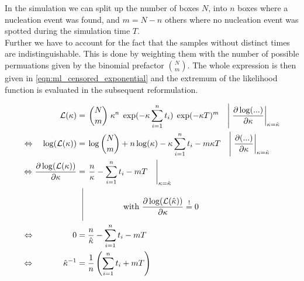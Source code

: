In the simulation we can split up the number of boxes $N$, into $n$ boxes where a nucleation event was found, and $m = N -n$ others where no nucleation event was spotted during the simulation time $T$.\\
Further we have to account for the fact that the samples without distinct times are indistinguishable. This is done by weighting them with the number of possible permuations given by the binomial prefactor $\binom{N}{m}$. The whole expression is then given in \autoref{eqn:ml_censored_exponential} and the extremum of the likelihood function is evaluated in the subsequent reformulation.

\begin{align}
\label{eqn:ml_censored_exponential} 
\mathcal{L}(\kappa) & = \left. \binom{N}{m} \;  \kappa^n \; \exp(- \kappa \sum_{i=1}^n t_i) \;  \exp(-\kappa T)^m \quad \right| \left.\frac{\partial \log ( ... )}{\partial \kappa} \right|_{\kappa=\hat{\kappa}} \\
\Leftrightarrow \quad\log ( \mathcal{L}(\kappa)) & = \left.\log\binom{N}{m}  + n \log ( \kappa) - \kappa \sum_{i=1}^n t_i - m \kappa T \quad \right| \left. \frac{\partial(...)}{\partial \kappa} \right|_{\kappa=\hat{\kappa}} \\
\Leftrightarrow \:\! \frac{\partial \log ( \mathcal{L}(\kappa))}{\partial \kappa} & = \left. \frac{n}{ \kappa} - \sum_{i=1}^n t_i - m  T \quad \right|_{\kappa=\hat{\kappa}}\\ 
 & \; \; \, \vrule
  \begin{aligned}[t]
      \raisebox{0.9cm}{ \makebox[1cm]{}} \raisebox{-0.5cm}{ \makebox[0.5cm]{}}  \text{with } \frac{\partial \log ( \mathcal{L}(\hat{\kappa})  )}{\partial \kappa}  \stackrel{!}{=} 0  \\
  \end{aligned} \nonumber\\
\Leftrightarrow \qquad\qquad \;\; \:\! 0 &= \frac{n}{ \hat{\kappa}} - \sum_{i=1}^n t_i - m  T \quad\\
\label{eqn:ml_censored_exponential_final}
 \Leftrightarrow \qquad\quad  \;\: \hat{\kappa}^{-1} &= \frac{1}{n} \left(  \sum_{i=1}^n t_i + m T \right)
\end{align}

